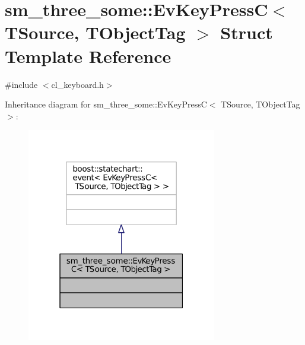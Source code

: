 \hypertarget{structsm__three__some_1_1EvKeyPressC}{}\section{sm\+\_\+three\+\_\+some\+:\+:Ev\+Key\+PressC$<$ T\+Source, T\+Object\+Tag $>$ Struct Template Reference}
\label{structsm__three__some_1_1EvKeyPressC}


{\ttfamily \#include $<$cl\+\_\+keyboard.\+h$>$}



Inheritance diagram for sm\+\_\+three\+\_\+some\+:\+:Ev\+Key\+PressC$<$ T\+Source, T\+Object\+Tag $>$\+:
\nopagebreak
\begin{figure}[H]
\begin{center}
\leavevmode
\includegraphics[width=235pt]{structsm__three__some_1_1EvKeyPressC__inherit__graph}
\end{center}
\end{figure}



